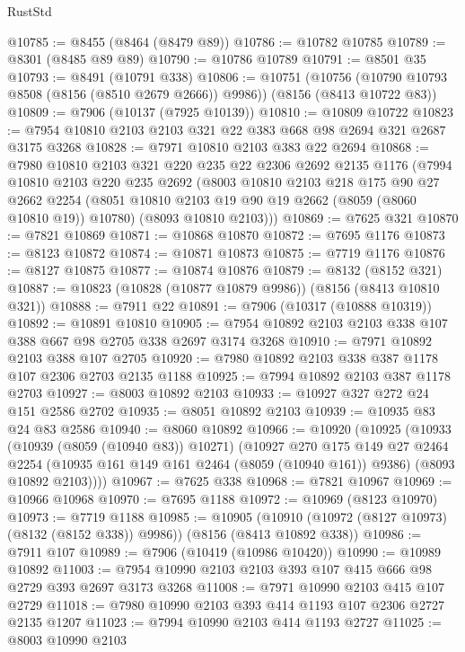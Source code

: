 \begin{lexlean}{RustStd}
\begin{coremodule}
@10785 := @8455 (@8464 (@8479 @89))
@10786 := @10782 @10785
@10789 := @8301 (@8485 @89 @89)
@10790 := @10786 @10789
@10791 := @8501 @35
@10793 := @8491 (@10791 @338)
@10806 := @10751
    (@10756 (@10790 @10793 @8508 (@8156 (@8510 @2679 @2666)) @9986))
    (@8156 (@8413 @10722 @83))
@10809 := @7906 (@10137 (@7925 @10139))
@10810 := @10809 @10722
@10823 := @7954 @10810 @2103 @2103 @321 @22 @383 @668 @98 @2694 @321 @2687 @3175 @3268
@10828 := @7971 @10810 @2103 @383 @22 @2694
@10868 := @7980
    @10810
    @2103
    @321
    @220
    @235
    @22
    @2306
    @2692
    @2135
    @1176
    (@7994
      @10810
      @2103
      @220
      @235
      @2692
      (@8003
        @10810
        @2103
        @218
        @175
        @90
        @27
        @2662
        @2254
        (@8051 @10810 @2103 @19 @90 @19 @2662 (@8059 (@8060 @10810 @19)) @10780)
        (@8093 @10810 @2103)))
@10869 := @7625 @321
@10870 := @7821 @10869
@10871 := @10868 @10870
@10872 := @7695 @1176
@10873 := @8123 @10872
@10874 := @10871 @10873
@10875 := @7719 @1176
@10876 := @8127 @10875
@10877 := @10874 @10876
@10879 := @8132 (@8152 @321)
@10887 := @10823 (@10828 (@10877 @10879 @9986)) (@8156 (@8413 @10810 @321))
@10888 := @7911 @22
@10891 := @7906 (@10317 (@10888 @10319))
@10892 := @10891 @10810
@10905 := @7954 @10892 @2103 @2103 @338 @107 @388 @667 @98 @2705 @338 @2697 @3174 @3268
@10910 := @7971 @10892 @2103 @388 @107 @2705
@10920 := @7980 @10892 @2103 @338 @387 @1178 @107 @2306 @2703 @2135 @1188
@10925 := @7994 @10892 @2103 @387 @1178 @2703
@10927 := @8003 @10892 @2103
@10933 := @10927 @327 @272 @24 @151 @2586 @2702
@10935 := @8051 @10892 @2103
@10939 := @10935 @83 @24 @83 @2586
@10940 := @8060 @10892
@10966 := @10920
    (@10925
      (@10933
        (@10939 (@8059 (@10940 @83)) @10271)
        (@10927
          @270
          @175
          @149
          @27
          @2464
          @2254
          (@10935 @161 @149 @161 @2464 (@8059 (@10940 @161)) @9386)
          (@8093 @10892 @2103))))
@10967 := @7625 @338
@10968 := @7821 @10967
@10969 := @10966 @10968
@10970 := @7695 @1188
@10972 := @10969 (@8123 @10970)
@10973 := @7719 @1188
@10985 := @10905
    (@10910 (@10972 (@8127 @10973) (@8132 (@8152 @338)) @9986))
    (@8156 (@8413 @10892 @338))
@10986 := @7911 @107
@10989 := @7906 (@10419 (@10986 @10420))
@10990 := @10989 @10892
@11003 := @7954 @10990 @2103 @2103 @393 @107 @415 @666 @98 @2729 @393 @2697 @3173 @3268
@11008 := @7971 @10990 @2103 @415 @107 @2729
@11018 := @7980 @10990 @2103 @393 @414 @1193 @107 @2306 @2727 @2135 @1207
@11023 := @7994 @10990 @2103 @414 @1193 @2727
@11025 := @8003 @10990 @2103

\end{coremodule}
\end{lexlean}
